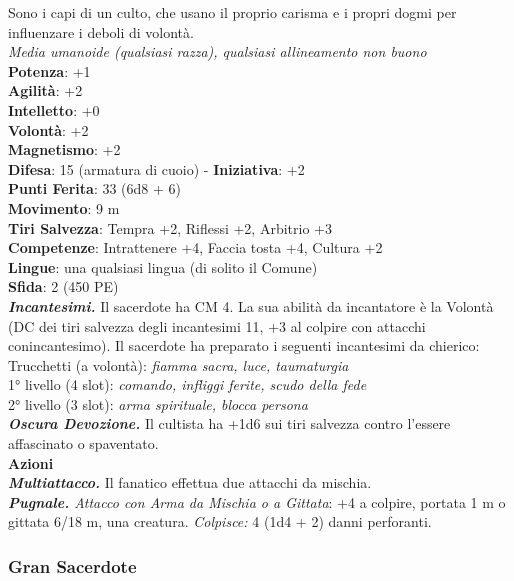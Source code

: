 \begin{multicols}{2}
Sono i capi di un culto, che usano il proprio carisma e i propri dogmi per influenzare i deboli di volontà.\\
\emph{Media umanoide (qualsiasi razza), qualsiasi allineamento non buono}\\
\textbf{Potenza}: +1\\
\textbf{Agilità}: +2\\
\textbf{Intelletto}: +0\\
\textbf{Volontà}: +2\\
\textbf{Magnetismo}: +2\\
\textbf{Difesa}: 15 (armatura di cuoio) - \textbf{Iniziativa}: +2\\
\textbf{Punti Ferita}: 33 (6d8 + 6)\\
\textbf{Movimento}: 9 m\\
\textbf{Tiri Salvezza}: Tempra +2, Riflessi +2, Arbitrio +3 \\
\textbf{Competenze}: Intrattenere +4, Faccia tosta +4, Cultura +2\\
\textbf{Lingue}: una qualsiasi lingua (di solito il Comune)\\
\textbf{Sfida}: 2 (450 PE)\smallskip\\
\emph{\textbf{Incantesimi.}} Il sacerdote ha CM 4. La sua abilità da incantatore è la Volontà (DC dei tiri salvezza degli incantesimi 11, +3 al colpire con attacchi conincantesimo). Il sacerdote ha preparato i seguenti incantesimi da chierico:\\
Trucchetti (a volontà): \emph{fiamma sacra, luce, taumaturgia} \\
1° livello (4 slot): \emph{comando, infliggi ferite, scudo della fede}\\
2° livello (3 slot): \emph{arma spirituale, blocca persona}\\
\emph{\textbf{Oscura Devozione.}} Il cultista ha +1d6 sui tiri salvezza contro l'essere affascinato o spaventato.\\
\smallskip\textbf{Azioni}\\
\emph{\textbf{Multiattacco.}} Il fanatico effettua due attacchi da mischia.\\
\emph{\textbf{Pugnale.} Attacco con Arma da Mischia o a Gittata}: +4 a colpire, portata 1 m o gittata 6/18 m, una creatura. \emph{Colpisce:} 4 (1d4 + 2) danni perforanti. \\

\subsubsection{Gran Sacerdote}


\end{multicols}
